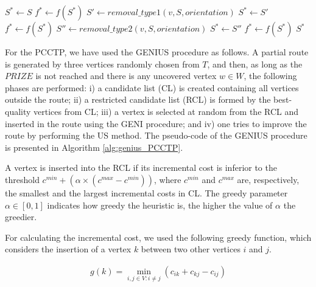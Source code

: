 \documentclass{ro}
\begin{document}

\begin{algorithm}[ht]
	\caption{\hspace{-1mm}:  US($S$)}
	\label{alg:us}
	\begin{algorithmic}[1]			
		\STATE $S^* \gets S$
		\STATE $f^* \gets f(S^*)$
		\STATE $S' \gets removal\_type1(v,S,orientation)$
		\STATE $S^* \gets S'$
		\STATE $f^* \gets f(S^*)$
		\ENDIF
		\STATE $S'' \gets removal\_type2(v,S,orientation)$
		\STATE $S^* \gets S''$
		\STATE $f^* \gets f(S^*)$
		\ENDIF
		\ENDFOR
		\ENDFOR
		\RETURN $S^*$
	\end{algorithmic}
	
\end{algorithm}

For the PCCTP, we have used the GENIUS procedure as follows. A partial route is generated by three vertices randomly chosen from $T$, and then, as long as the $PRIZE$ is not reached and there is any uncovered vertex $w \in W$, the following phases are performed: i) a candidate list (CL) is created containing all vertices outside the route; ii) a  restricted candidate list (RCL) is formed by the best-quality vertices from CL; iii) a vertex is selected at random from the RCL and inserted in the route using the GENI procedure; and iv) one tries to improve the route by performing the US method. The pseudo-code of the GENIUS procedure is presented in Algorithm \ref{alg:genius_PCCTP}.

A vertex is inserted into the RCL if its incremental cost is inferior to the threshold $c^{min} + (\alpha \times (c^{max} - c^{min}))$, where $c^{min}$ and $c^{max}$ are, respectively, the smallest and the largest incremental costs in CL. The greedy parameter $\alpha \in [0,1]$ indicates how greedy the heuristic is, the higher the value of $\alpha$ the greedier.

For calculating the incremental cost, we used the following greedy function, which considers the insertion of a vertex $k$ between two other vertices $i$ and $j$.

\begin{eqnarray}
g(k) = \displaystyle \min_{i,j \in V : i \neq j} \left(c_{ik} + c_{kj}  - c_{ij}\right) \label{custo_inc}
\end{eqnarray}
\end{document}
